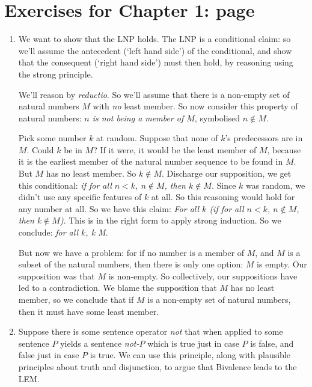 
\section*{Exercises for Chapter 1: page \pageref{ex1}} \label{ans1}

{\small
\begin{enumerate}
	\item We want to show that the LNP holds. The LNP is a conditional claim: so we'll assume the antecedent (`left hand side') of the conditional, and show that the consequent (`right hand side') must then hold, by reasoning using the strong principle.

	We'll reason by \emph{reductio}. So we'll assume that there is a non-empty set of natural numbers $M$ with \emph{no} least member. So now consider this property of natural numbers: \emph{$n$ is not being a member of $M$}, symbolised $n \notin M$.

	Pick some number $k$ at random. Suppose that none of $k$'s  predecessors are in $M$. Could $k$ be in $M$? If it were, it would be the least member of $M$, because it is the earliest member of the natural number sequence to be found in $M$. But $M$ has no least member. So $k\notin M$. Discharge our supposition, we get this conditional: \emph{if for all $n<k$, $n\notin M$, then $k\notin M$}. Since $k$ was random, we didn't use any specific features of $k$ at all. So this reasoning would hold for any number at all. So we have this claim: \emph{For all $k$ (if for all $n<k$, $n\notin M$, then $k\notin M$)}. This is in the right form to apply strong induction. So we conclude: \emph{for all $k$, k \notin M}.

	But now we have a problem: for if no number is a member of $M$, and $M$ is a subset of the natural numbers, then there is only one option: $M$ is empty. Our supposition was that $M$ is non-empty. So collectively,  our suppositions have led to a contradiction. We blame the supposition that $M$ has no least member, so we conclude that if $M$ is a non-empty set of natural numbers, then it must have some least member.

	 \item  Suppose there is some sentence operator \emph{not} that when applied to some sentence $P$ yields a sentence \emph{not-$P$} which is true just in case $P$ is false, and false just in case $P$ is true. We can use this principle, along with plausible principles about truth and disjunction, to argue that Bivalence leads to the LEM.


\end{enumerate}}
